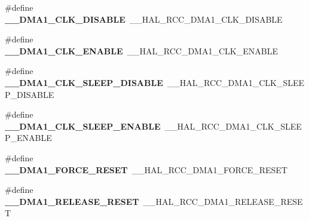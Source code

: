 \begin{DoxyCompactItemize}
\item 
\hypertarget{group___h_a_l___r_c_c___aliased_ga153f57f9b39b25f0e6cde82e6d84473d}{\#define {\bfseries \-\_\-\-\_\-\-D\-M\-A1\-\_\-\-C\-L\-K\-\_\-\-D\-I\-S\-A\-B\-L\-E}~\-\_\-\-\_\-\-H\-A\-L\-\_\-\-R\-C\-C\-\_\-\-D\-M\-A1\-\_\-\-C\-L\-K\-\_\-\-D\-I\-S\-A\-B\-L\-E}\label{group___h_a_l___r_c_c___aliased_ga153f57f9b39b25f0e6cde82e6d84473d}

\item 
\hypertarget{group___h_a_l___r_c_c___aliased_gab7bc4cf6efeb1ea610682993cea17995}{\#define {\bfseries \-\_\-\-\_\-\-D\-M\-A1\-\_\-\-C\-L\-K\-\_\-\-E\-N\-A\-B\-L\-E}~\-\_\-\-\_\-\-H\-A\-L\-\_\-\-R\-C\-C\-\_\-\-D\-M\-A1\-\_\-\-C\-L\-K\-\_\-\-E\-N\-A\-B\-L\-E}\label{group___h_a_l___r_c_c___aliased_gab7bc4cf6efeb1ea610682993cea17995}

\item 
\hypertarget{group___h_a_l___r_c_c___aliased_ga78df1bf8400fee8e98d8ba43312bdc5e}{\#define {\bfseries \-\_\-\-\_\-\-D\-M\-A1\-\_\-\-C\-L\-K\-\_\-\-S\-L\-E\-E\-P\-\_\-\-D\-I\-S\-A\-B\-L\-E}~\-\_\-\-\_\-\-H\-A\-L\-\_\-\-R\-C\-C\-\_\-\-D\-M\-A1\-\_\-\-C\-L\-K\-\_\-\-S\-L\-E\-E\-P\-\_\-\-D\-I\-S\-A\-B\-L\-E}\label{group___h_a_l___r_c_c___aliased_ga78df1bf8400fee8e98d8ba43312bdc5e}

\item 
\hypertarget{group___h_a_l___r_c_c___aliased_ga38e380cb1fa25bab0fe185f9dc8a1c03}{\#define {\bfseries \-\_\-\-\_\-\-D\-M\-A1\-\_\-\-C\-L\-K\-\_\-\-S\-L\-E\-E\-P\-\_\-\-E\-N\-A\-B\-L\-E}~\-\_\-\-\_\-\-H\-A\-L\-\_\-\-R\-C\-C\-\_\-\-D\-M\-A1\-\_\-\-C\-L\-K\-\_\-\-S\-L\-E\-E\-P\-\_\-\-E\-N\-A\-B\-L\-E}\label{group___h_a_l___r_c_c___aliased_ga38e380cb1fa25bab0fe185f9dc8a1c03}

\item 
\hypertarget{group___h_a_l___r_c_c___aliased_ga1b49adf6ce960db1fc3e97c015904a4e}{\#define {\bfseries \-\_\-\-\_\-\-D\-M\-A1\-\_\-\-F\-O\-R\-C\-E\-\_\-\-R\-E\-S\-E\-T}~\-\_\-\-\_\-\-H\-A\-L\-\_\-\-R\-C\-C\-\_\-\-D\-M\-A1\-\_\-\-F\-O\-R\-C\-E\-\_\-\-R\-E\-S\-E\-T}\label{group___h_a_l___r_c_c___aliased_ga1b49adf6ce960db1fc3e97c015904a4e}

\item 
\hypertarget{group___h_a_l___r_c_c___aliased_ga30b3a917fca9f9ea9004c310ed3cefe6}{\#define {\bfseries \-\_\-\-\_\-\-D\-M\-A1\-\_\-\-R\-E\-L\-E\-A\-S\-E\-\_\-\-R\-E\-S\-E\-T}~\-\_\-\-\_\-\-H\-A\-L\-\_\-\-R\-C\-C\-\_\-\-D\-M\-A1\-\_\-\-R\-E\-L\-E\-A\-S\-E\-\_\-\-R\-E\-S\-E\-T}\label{group___h_a_l___r_c_c___aliased_ga30b3a917fca9f9ea9004c310ed3cefe6}


\end{DoxyCompactItemize}
